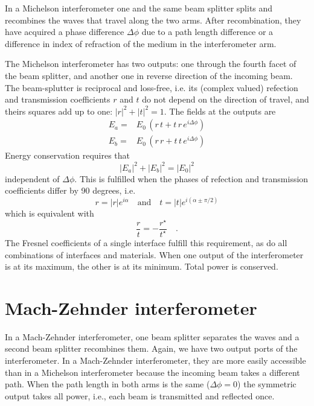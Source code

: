 In a Michelson interferometer one and the same beam splitter splits and recombines the waves that travel along the two arms. After recombination, they have acquired a phase difference $\Delta \phi$ due to a path length difference or a difference in index of refraction of the medium in the interferometer arm.

The Michelson interferometer has two outputs: one through the fourth facet of the beam splitter, and another one in reverse direction of the incoming beam. The beam-splutter is reciprocal and loss-free, i.e. its (complex valued) refection and transmission coefficients $r$ and $t$ do not depend on the direction of travel, and theirs squares add up to one: $|r|^2+ |t|^2 = 1$. The fields at the outputs are
\begin{align}
  E_a = & E_0 \, \left( r \, t  + t \, r \, e^{i \Delta \phi} \right) \\
  E_b = & E_0 \, \left( r \, r  + t \, t  \, e^{i \Delta \phi} \right) 
\end{align}
Energy conservation requires that 
\begin{equation}
  |E_a|^2 +  |E_b|^2 =  |E_0|^2
\end{equation}
independent of $\Delta \phi$. This is fulfilled when the phases of refection and transmission coefficients differ by 90 degrees, i.e.
\begin{equation}
  r = |r| e^{i \alpha} \quad \text{and} \quad  t = |t| e^{i (\alpha \pm \pi/2) } 
\end{equation}
which is equivalent with
\begin{equation}
  \frac{r}{t} = - \frac{r^\star}{t^\star} \quad.
\end{equation}
The Fresnel coefficients of a single interface fulfill this requirement, as do all combinations of interfaces and materials. When one output of the interferometer is at its maximum, the other is at its minimum. Total power is conserved.


\section{Mach-Zehnder interferometer}

In a Mach-Zehnder interferometer, one beam splitter separates the waves and a second beam splitter recombines them. Again, we have two output ports of the interferometer. In a Mach-Zehnder interferometer, they are more easily accessible than in a Michelson interferometer because the incoming beam takes a different path. When the path length in both arms is the same ($\Delta \phi = 0$) the symmetric output takes all power, i.e., each beam is transmitted and reflected once.

